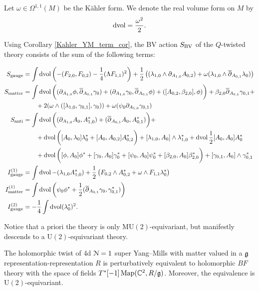 \documentclass[10pt, oneside]{article}
\newcommand{\MU}{\mathrm{MU}}
\renewcommand{\U}{\mathrm{U}}
\begin{document}
Let $\omega\in\Omega^{1, 1}(M)$ be the K\"ahler form. We denote the real volume form on $M$ by
\[\operatorname{dvol} = \frac{\omega^2}{2}.\]

Using Corollary \ref{Kahler_YM_term_cor}, the BV action $S_{\mathrm{BV}}$ of the $Q$-twisted theory consists of the sum of the following terms:

\begin{align*}
S_{\mathrm{gauge}} &= \int\operatorname{dvol}\left(-(F_{2, 0}, F_{0, 2}) - \frac{1}{4}(\Lambda F_{1, 1})^2\right) + \frac 12 \left((\lambda_{1,0} \wedge \partial_{A_{1,0}} A_{0,2}) + \omega (\lambda_{1,0} \wedge \overline{\partial}_{A_{0,1}} \lambda_0) \right)  \\
S_{\mathrm{matter}} &= \int \operatorname{dvol} \bigg((\partial_{A_{1,0}}\phi , \overline{\partial}_{A_{0,1}} \gamma_0) + (\partial_{A_{1,0}}\gamma_0, \overline{\partial}_{A_{0,1}} \phi) + ([A_{0,2}, \beta_{2,0}], \phi) \bigg) + \beta_{2,0} \overline{\partial}_{A_{0,1}} \gamma_{0,1}  + \\
&\qquad + 2 (\omega \wedge ([\lambda_{1,0}, \gamma_{0,1}] ,\gamma_{0})  ) + \omega (\psi_0 \partial_{A_{1,0}} \gamma_{0,1}) \\
S_{\mathrm{anti}} &= \int \operatorname{dvol} \bigg((\partial_{A_{1, 0}} A_0, A_{1,0}^*) + (\overline{\partial}_{A_{0, 1}} A_0, A_{0,1}^*) \bigg) +  \\
& \qquad + \operatorname{dvol} \bigg([A_0, \lambda_0] \lambda_0^* + [A_0, A_{0,2}] A_{0,2}^* \bigg) + [\lambda_{1,0}, A_0] \wedge \lambda_{1,0}^* + \operatorname{dvol} \frac{1}{2}[A_0, A_0]A_0^*\\ 
&\qquad  + \operatorname{dvol} \bigg( [\phi, A_0] \phi^* + [\gamma_0, A_0] \gamma_0^*  + [\psi_0, A_0] \psi_0^* + [\beta_{2,0}, A_0] \beta_{2,0}^* \bigg) + [\gamma_{0,1}, A_0]\wedge \gamma_{0,1}^*\\
I^{(1)}_{\mathrm{gauge}} &=  \int  \operatorname{dvol} - (\lambda_{1,0} A_{1,0}^*)  + \frac 12  \left(F_{0,2}\wedge A_{0,2}^*+ \omega\wedge F_{1,1} \lambda_0^*  \right) \\
I^{(1)}_{\mathrm{matter}} &=  \int  \operatorname{dvol} \left( \psi_0 \phi^* + \frac 12 ( \overline{\partial}_{A_{0,1}} \gamma_{0} , \gamma_{0,1}^*) \right)\\
I^{(2)}_{\mathrm{gauge}} &= -\frac{1}{4}\int \operatorname{dvol}(\lambda_0^*)^2.
\end{align*}

Notice that a priori the theory is only $\MU(2)$-equivariant, but manifestly descends to a $\U(2)$-equivariant theory. 

\begin{theorem} \label{4d_minimal_twist_thm}
The holomorphic twist of 4d $\mathcal N=1$ super Yang--Mills with matter valued in a $\mathfrak g$representation-representation $R$ is perturbatively equivalent to holomorphic $BF$ theory with the space of fields $T^*[-1]\operatorname{Map}(\mathbb C^2, R/\mathfrak g)$. Moreover, the equivalence is $\U(2)$-equivariant.
\end{theorem}
\end{document}
